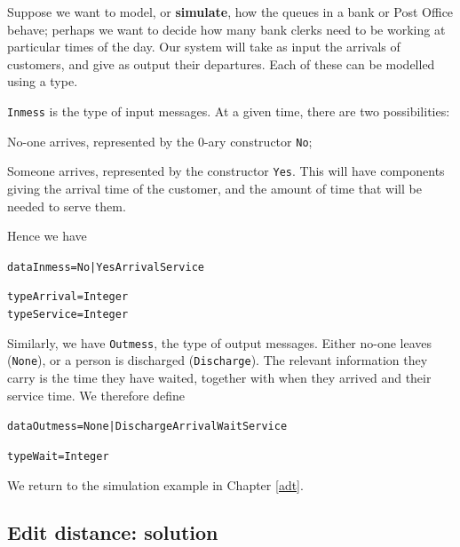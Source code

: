 Suppose we want to model, or \textbf{simulate}, how the queues in a bank or Post
Office behave; perhaps we want to decide how many bank clerks need to be
working at particular times of the day. Our system will take as input the
arrivals of customers, and give as output their departures. Each of these can
be modelled using a type.
\vspace{3pt}
\begin{titemize}
\item \texttt{Inmess} is the type of input messages. At a given time, there are
two possibilities:
\vspace{3pt}
\begin{titemize}
\item[--] No-one arrives, represented by the 0-ary constructor \texttt{No};
\item[--] Someone arrives, represented by the constructor \texttt{Yes}. This will
have components giving the arrival time of the customer, and the amount of time
that will
be needed to serve them. 
\end{titemize}
Hence we have
\begin{alltt}
data Inmess = No | Yes Arrival Service

type Arrival = Integer
type Service = Integer
\end{alltt}  
\item Similarly, we have \texttt{Outmess}, the type of output messages. Either
no-one leaves (\texttt{None}), or a person is discharged (\texttt{Discharge}). The
relevant information they carry is the time they have waited, together with
when they arrived and their service time. We therefore define
\begin{alltt}
data Outmess = None | Discharge Arrival Wait Service

type Wait = Integer
\end{alltt}
\end{titemize}
We return to the simulation example in Chapter \ref{adt}.


\subsection*{Edit distance: solution}
\vspace{3pt}

